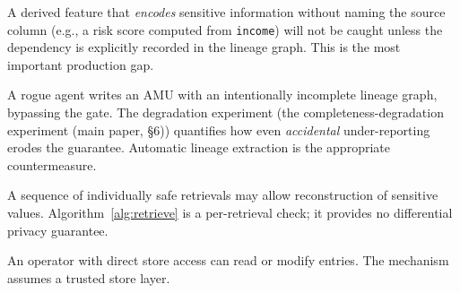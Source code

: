 \documentclass[9pt,twocolumn,twoside]{extarticle}
\begin{document}
\begin{description}[leftmargin=1.2em,itemsep=3pt]
\item[T4 --- Inference attacks.]
  A derived feature that \emph{encodes} sensitive information without naming
  the source column (e.g., a risk score computed from \texttt{income}) will not
  be caught unless the dependency is explicitly recorded in the lineage graph.
  This is the most important production gap.

\item[T5 --- Malicious lineage fabrication.]
  A rogue agent writes an AMU with an intentionally incomplete lineage graph,
  bypassing the gate.
  The degradation experiment (the completeness-degradation experiment (main paper, \S6)) quantifies how even
  \emph{accidental} under-reporting erodes the guarantee.
  Automatic lineage extraction is the appropriate countermeasure.

\item[T6 --- Aggregate inference.]
  A sequence of individually safe retrievals may allow reconstruction of
  sensitive values.
  Algorithm~\ref{alg:retrieve} is a per-retrieval check; it provides no
  differential privacy guarantee.

\item[T7 --- Insider threats.]
  An operator with direct store access can read or modify entries.
  The mechanism assumes a trusted store layer.


\end{description}
\end{document}
